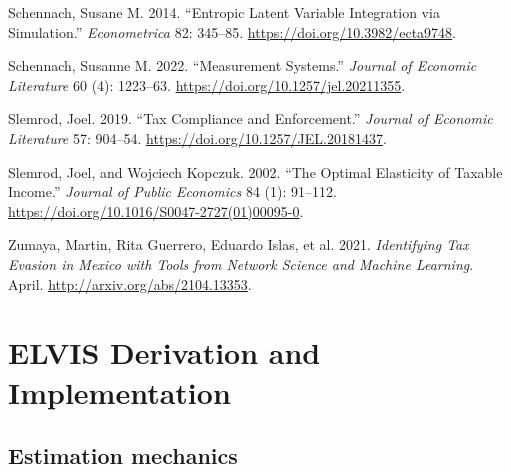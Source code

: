 \documentclass[
  12pt,
  letterpaper,
  oneside,
  openany]{report}
\newlength{\cslhangindent}
\newenvironment{CSLReferences}[2] %
 {\begin{list}{}{%
  \setlength{\itemindent}{0pt}
  \setlength{\leftmargin}{0pt}
  \setlength{\parsep}{0pt}
  \ifodd #1
   \setlength{\leftmargin}{\cslhangindent}
   \setlength{\itemindent}{-1\cslhangindent}
  \fi
  \setlength{\itemsep}{#2\baselineskip}}}
 {\end{list}}
\begin{document}
\begin{CSLReferences}{1}{1}
Schennach, Susane M. 2014. {``Entropic Latent Variable Integration via
Simulation.''} \emph{Econometrica} 82: 345--85.
\url{https://doi.org/10.3982/ecta9748}.

Schennach, Susanne M. 2022. {``Measurement Systems.''} \emph{Journal of
Economic Literature} 60 (4): 1223--63.
\url{https://doi.org/10.1257/jel.20211355}.

Slemrod, Joel. 2019. {``Tax Compliance and Enforcement.''} \emph{Journal
of Economic Literature} 57: 904--54.
\url{https://doi.org/10.1257/JEL.20181437}.

Slemrod, Joel, and Wojciech Kopczuk. 2002. {``The Optimal Elasticity of
Taxable Income.''} \emph{Journal of Public Economics} 84 (1): 91--112.
\url{https://doi.org/10.1016/S0047-2727(01)00095-0}.

Zumaya, Martin, Rita Guerrero, Eduardo Islas, et al. 2021.
\emph{Identifying Tax Evasion in Mexico with Tools from Network Science
and Machine Learning}. April. \url{http://arxiv.org/abs/2104.13353}.

\end{CSLReferences}

\cleardoublepage
{}
{}
\appendix

\chapter{ELVIS Derivation and Implementation}\label{sec-app-elvis}


\section{Estimation mechanics}\label{estimation-mechanics}
\end{document}
